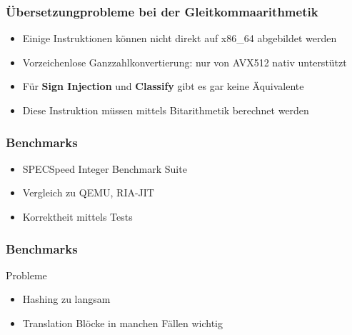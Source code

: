 \begin{frame}
    \frametitle{Übersetzungprobleme bei der Gleitkommaarithmetik}
    \begin{itemize}
        \setlength{\itemsep}{1em}
        \item Einige Instruktionen können nicht direkt auf x86\_64 abgebildet werden
        \item Vorzeichenlose Ganzzahlkonvertierung: nur von AVX512 nativ unterstützt
        \item Für \textbf{Sign Injection} und \textbf{Classify} gibt es gar keine Äquivalente
        \item Diese Instruktion müssen mittels Bitarithmetik berechnet werden
    \end{itemize}
\end{frame}

\clearpage


\begin{frame}
    \frametitle{Benchmarks}


    \note[item]{}

    \begin{itemize}
        \item SPECSpeed Integer Benchmark Suite
        \item Vergleich zu QEMU, RIA-JIT
        \item Korrektheit mittels Tests
    \end{itemize}
\end{frame}


\begin{frame}
    \frametitle{Benchmarks}{Probleme}

    \begin{itemize}
        \item Hashing zu langsam
        \item Translation Blöcke in manchen Fällen wichtig
    \end{itemize}
\end{frame}


